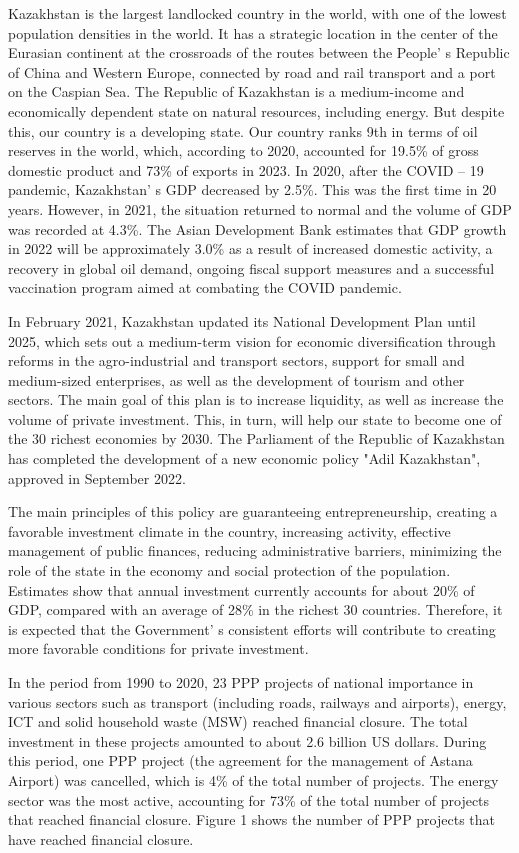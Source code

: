 \begin{multicols}{2}
Kazakhstan is the largest landlocked country in the world, with one of
the lowest population densities in the world. It has a strategic
location in the center of the Eurasian continent at the crossroads of
the routes between the People' s Republic of China and
Western Europe, connected by road and rail transport and a port on the
Caspian Sea. The Republic of Kazakhstan is a medium-income and
economically dependent state on natural resources, including energy. But
despite this, our country is a developing state. Our country ranks 9th
in terms of oil reserves in the world, which, according to 2020,
accounted for 19.5\% of gross domestic product and 73\% of exports in
2023. In 2020, after the COVID -- 19 pandemic, Kazakhstan' s
GDP decreased by 2.5\%. This was the first time in 20 years. However, in
2021, the situation returned to normal and the volume of GDP was
recorded at 4.3\%. The Asian Development Bank estimates that GDP growth
in 2022 will be approximately 3.0\% as a result of increased domestic
activity, a recovery in global oil demand, ongoing fiscal support
measures and a successful vaccination program aimed at combating the
COVID pandemic.

In February 2021, Kazakhstan updated its National Development Plan until
2025, which sets out a medium-term vision for economic diversification
through reforms in the agro-industrial and transport sectors, support
for small and medium-sized enterprises, as well as the development of
tourism and other sectors. The main goal of this plan is to increase
liquidity, as well as increase the volume of private investment. This,
in turn, will help our state to become one of the 30 richest economies
by 2030. The Parliament of the Republic of Kazakhstan has completed the
development of a new economic policy "Adil Kazakhstan", approved in
September 2022.

The main principles of this policy are guaranteeing entrepreneurship,
creating a favorable investment climate in the country, increasing
activity, effective management of public finances, reducing
administrative barriers, minimizing the role of the state in the economy
and social protection of the population. Estimates show that annual
investment currently accounts for about 20\% of GDP, compared with an
average of 28\% in the richest 30 countries. Therefore, it is expected
that the Government' s consistent efforts will contribute
to creating more favorable conditions for private investment.

In the period from 1990 to 2020, 23 PPP projects of national importance
in various sectors such as transport (including roads, railways and
airports), energy, ICT and solid household waste (MSW) reached financial
closure. The total investment in these projects amounted to about 2.6
billion US dollars. During this period, one PPP project (the agreement
for the management of Astana Airport) was cancelled, which is 4\% of the
total number of projects. The energy sector was the most active,
accounting for 73\% of the total number of projects that reached
financial closure. Figure 1 shows the number of PPP projects that have
reached financial closure.
\end{multicols}

